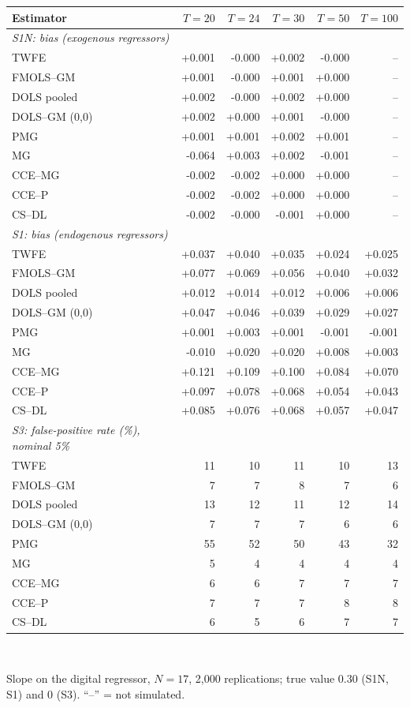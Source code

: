 \begin{tabular}{lrrrrr}\toprule
Estimator & $T=20$ & $T=24$ & $T=30$ & $T=50$ & $T=100$ \\
\midrule
\textit{S1N: bias (exogenous regressors)} &  &  &  &  &  \\
TWFE & +0.001 & -0.000 & +0.002 & -0.000 & -- \\
FMOLS--GM & +0.001 & -0.000 & +0.001 & +0.000 & -- \\
DOLS pooled & +0.002 & -0.000 & +0.002 & +0.000 & -- \\
DOLS--GM (0,0) & +0.002 & +0.000 & +0.001 & -0.000 & -- \\
PMG & +0.001 & +0.001 & +0.002 & +0.001 & -- \\
MG & -0.064 & +0.003 & +0.002 & -0.001 & -- \\
CCE--MG & -0.002 & -0.002 & +0.000 & +0.000 & -- \\
CCE--P & -0.002 & -0.002 & +0.000 & +0.000 & -- \\
CS--DL & -0.002 & -0.000 & -0.001 & +0.000 & -- \\
\midrule
\textit{S1: bias (endogenous regressors)} &  &  &  &  &  \\
TWFE & +0.037 & +0.040 & +0.035 & +0.024 & +0.025 \\
FMOLS--GM & +0.077 & +0.069 & +0.056 & +0.040 & +0.032 \\
DOLS pooled & +0.012 & +0.014 & +0.012 & +0.006 & +0.006 \\
DOLS--GM (0,0) & +0.047 & +0.046 & +0.039 & +0.029 & +0.027 \\
PMG & +0.001 & +0.003 & +0.001 & -0.001 & -0.001 \\
MG & -0.010 & +0.020 & +0.020 & +0.008 & +0.003 \\
CCE--MG & +0.121 & +0.109 & +0.100 & +0.084 & +0.070 \\
CCE--P & +0.097 & +0.078 & +0.068 & +0.054 & +0.043 \\
CS--DL & +0.085 & +0.076 & +0.068 & +0.057 & +0.047 \\
\midrule
\textit{S3: false-positive rate (\%), nominal 5\%} &  &  &  &  &  \\
TWFE & 11 & 10 & 11 & 10 & 13 \\
FMOLS--GM & 7 & 7 & 8 & 7 & 6 \\
DOLS pooled & 13 & 12 & 11 & 12 & 14 \\
DOLS--GM (0,0) & 7 & 7 & 7 & 6 & 6 \\
PMG & 55 & 52 & 50 & 43 & 32 \\
MG & 5 & 4 & 4 & 4 & 4 \\
CCE--MG & 6 & 6 & 7 & 7 & 7 \\
CCE--P & 7 & 7 & 7 & 8 & 8 \\
CS--DL & 6 & 5 & 6 & 7 & 7 \\
\bottomrule\end{tabular}
\\[3pt]\begin{minipage}{\tablewidth}\footnotesize Slope on the digital regressor, $N=17$, 2,000 replications; true value 0.30 (S1N, S1) and 0 (S3). ``--'' = not simulated.\end{minipage}
